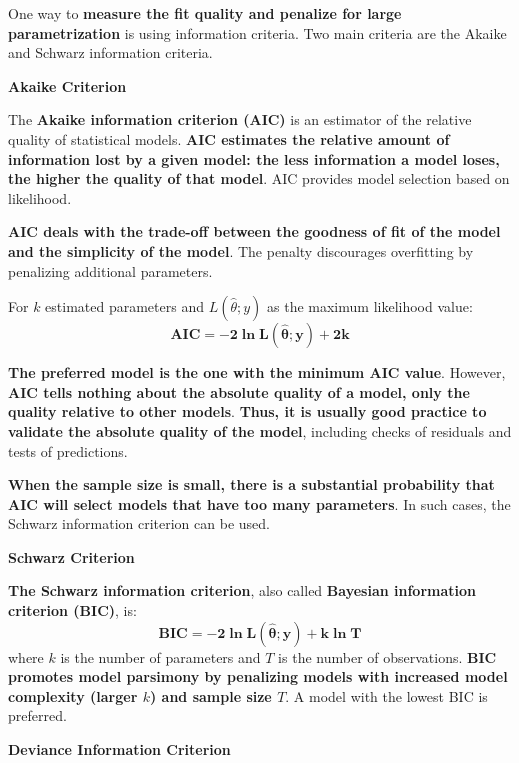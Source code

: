 \documentclass[12pt,a4paper]{article}
\begin{document}
One way to \textbf{measure the fit quality and penalize for large parametrization} is using information criteria. Two main criteria are the Akaike and Schwarz information criteria.

\vspace{0.5em}

\textbf{Akaike Criterion}

The \textbf{Akaike information criterion (AIC)} is an estimator of the relative quality of statistical models. \textbf{AIC estimates the relative amount of information lost by a given model: the less information a model loses, the higher the quality of that model}. AIC provides model selection based on likelihood.

\textbf{AIC deals with the trade-off between the goodness of fit of the model and the simplicity of the model}. The penalty discourages overfitting by penalizing additional parameters.

\vspace{0.3em}

For $k$ estimated parameters and $L(\hat{\theta}; y)$ as the maximum likelihood value:
\[
\mathbf{\text{AIC} = -2 \ln L(\hat{\theta}; y) + 2k}
\]

\textbf{The preferred model is the one with the minimum AIC value}. However, \textbf{AIC tells nothing about the absolute quality of a model, only the quality relative to other models}. \textbf{Thus, it is usually good practice to validate the absolute quality of the model}, including checks of residuals and tests of predictions.

\textbf{When the sample size is small, there is a substantial probability that AIC will select models that have too many parameters}. In such cases, the Schwarz information criterion can be used.

\vspace{0.5em}

\textbf{Schwarz Criterion}

\textbf{The Schwarz information criterion}, also called \textbf{Bayesian information criterion (BIC)}, is:
\[
\mathbf{\text{BIC} = -2 \ln L(\hat{\theta}; y) + k \ln T}
\]
where $k$ is the number of parameters and $T$ is the number of observations. \textbf{BIC promotes model parsimony by penalizing models with increased model complexity (larger $k$) and sample size $T$}. A model with the lowest BIC is preferred.

\vspace{0.5em}

\textbf{Deviance Information Criterion}
\end{document}
